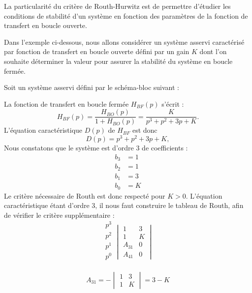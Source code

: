 La particularité du critère de Routh-Hurwitz est de permettre d'étudier les 
conditions de stabilité d'un système en fonction des paramètres de la fonction 
de transfert en boucle ouverte.

Dans l'exemple ci-dessous, nous allons considérer un système asservi 
caractérisé par fonction de transfert en boucle ouverte défini par un gain $K$
dont l'on souhaite déterminer la valeur pour assurer la stabilité du système en 
boucle fermée.

Soit un système asservi défini par le schéma-bloc suivant :
\begin{center}
    
\end{center}
La fonction de transfert en boucle fermée $H_{BF}(p)$ s'écrit :
\[
    H_{BF}(p)=\dfrac{H_{BO}(p)}{1+H_{BO}(p)}=\dfrac{K}{p^3+p^2+3p+K}.
\]
L'équation caractéristique $D(p)$ de $H_{BF}$ est donc 
\[
    D(p)=p^3+p^2+3p+K,
\]
Nous constatons que le système est d'ordre 3 de coefficients :
\begin{align*}
    b_3&=1\\
    b_2&=1\\
    b_1&=3\\
    b_0&=K
\end{align*}
Le critère nécessaire de Routh est donc respecté pour $K>0$. L'équation 
caractéristique étant d'ordre 3, il nous faut construire le tableau de Routh, 
afin de vérifier le critère supplémentaire :
\[
\begin{matrix}
    p^3 \\
    p^2 \\
    \hline
    p^1 \\
    p^0 \\
\end{matrix}
\begin{vmatrix}
     1      & 3  \\
     1      & K  \\
    \hline
    A_{31}  & 0  \\
    A_{41}  & 0    
\end{vmatrix}
\]

\[
A_{31}=-\begin{vmatrix}1 & 3 \\ 1 & K\end{vmatrix}=3-K
\]

